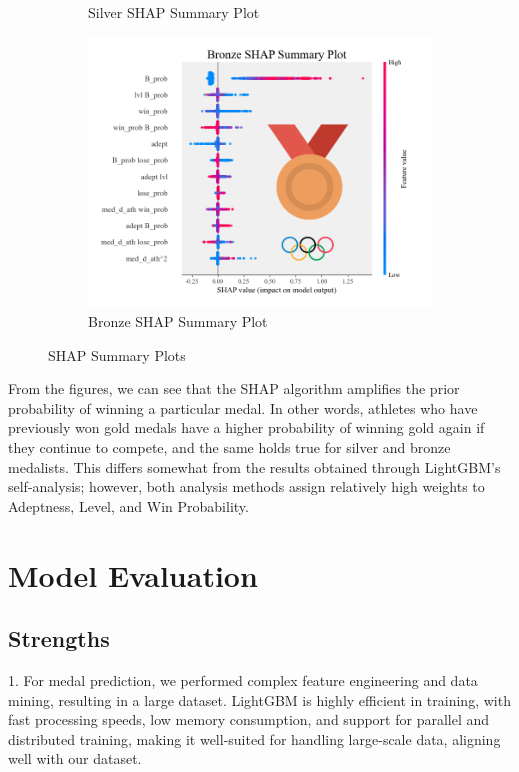\documentclass[12pt]{article}  %
\begin{document}
\begin{figure}[htbp]
\begin{subfigure}[b]{.32\textwidth}
		\caption{Silver SHAP Summary Plot}\label{subfig:2}
	\end{subfigure}
	\hfill 
	\begin{subfigure}[b]{.32\textwidth}
		\includegraphics[width=\textwidth]{img/shap3.png}
		\caption{Bronze SHAP Summary Plot}\label{subfig:3}
	\end{subfigure}
	\caption{SHAP Summary Plots}\label{fig:subfigures}
\end{figure}
From the figures, we can see that the SHAP algorithm amplifies the prior probability of winning a particular medal. In other words, athletes who have previously won gold medals have a higher probability of winning gold again if they continue to compete, and the same holds true for silver and bronze medalists. This differs somewhat from the results obtained through LightGBM's self-analysis; however, both analysis methods assign relatively high weights to Adeptness, Level, and Win Probability.

\section{Model Evaluation}
\subsection{Strengths}
1. For medal prediction, we performed complex feature engineering and data mining, resulting in a large dataset. LightGBM is highly efficient in training, with fast processing speeds, low memory consumption, and support for parallel and distributed training, making it well-suited for handling large-scale data, aligning well with our dataset.
\end{document}
